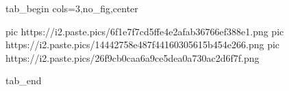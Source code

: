  
 
 
 
 


\ifcmt
  tab_begin cols=3,no_fig,center

     pic https://i2.paste.pics/6f1e7f7cd5ffe4e2afab36766ef388e1.png
		 pic https://i2.paste.pics/14442758e487f44160305615b454e266.png
		 pic https://i2.paste.pics/26f9cb0caa6a9ce5dea0a730ac2d6f7f.png

  tab_end
\fi

